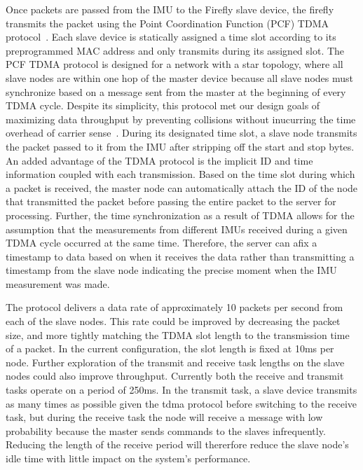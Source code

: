\documentclass[conference]{IEEEtran}
\begin{document}
Once packets are passed from the IMU to the Firefly slave device, the firefly transmits
the packet using the Point Coordination Function (PCF) TDMA protocol~\cite{pcf}. Each
slave device is statically assigned a time slot according to its preprogrammed MAC address
and only transmits during its assigned slot. The PCF TDMA protocol is designed for a
network with a star topology, where all slave nodes are within one hop of the master
device because all slave nodes must synchronize based on a message sent from the master at
the beginning of every TDMA cycle.  Despite its simplicity, this protocol met our design
goals of maximizing data throughput by preventing collisions without inucurring the time
overhead of carrier sense~\cite{CSMA}.  During its designated time slot, a slave node
transmits the packet passed to it from the IMU after stripping off the start and stop
bytes. An added advantage of the TDMA protocol is the implicit ID and time information
coupled with each transmission. Based on the time slot during which a packet is received,
the master node can automatically attach the ID of the node that transmitted the packet
before passing the entire packet to the server for processing. Further, the time
synchronization as a result of TDMA allows for the assumption that the measurements from
different IMUs received during a given TDMA cycle occurred at the same time. Therefore,
the server can afix a timestamp to data based on when it receives the data rather than
transmitting a timestamp from the slave node indicating the precise moment when the IMU
measurement was made. 

The protocol delivers a data rate of approximately 10 packets per second from each of
the slave nodes. This rate could be improved by decreasing the packet size, and more
tightly matching the TDMA slot length to the transmission time of a packet. In the current
configuration, the slot length is fixed at 10ms per node. Further exploration of the
transmit and receive task lengths on the slave nodes could also improve throughput.
Currently both the receive and transmit tasks operate on a period of 250ms. In the
transmit task, a slave device transmits as many times as possible given the tdma protocol
before switching to the receive task, but during the receive task the node will receive a
message with low probability because the master sends commands to the slaves infrequently.
Reducing the length of the receive period will thererfore reduce the slave node's idle
time with little impact on the system's performance. 
\end{document}
